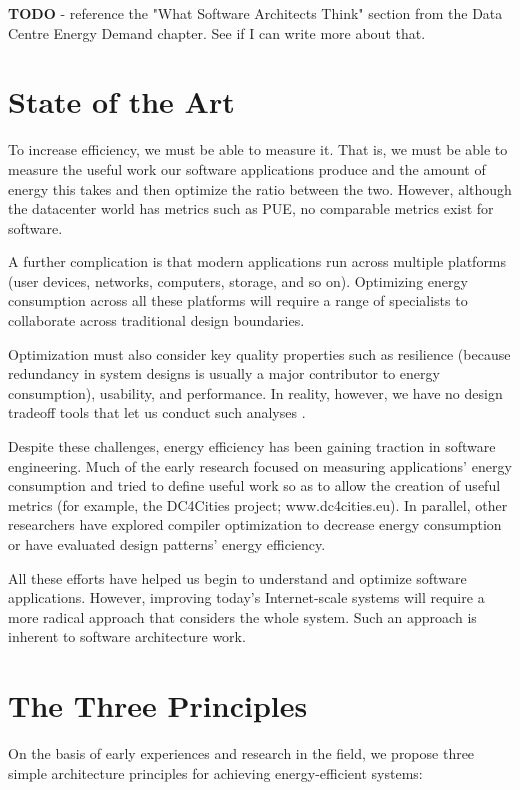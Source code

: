 \textbf{TODO} - reference the "What Software Architects Think" section from the Data Centre Energy Demand chapter.  See if I can write more about that.

\section{State of the Art}

To increase efficiency, we must be able to measure it. That is, we must be able to measure the useful work our software applications produce and the amount of energy this takes and then optimize the ratio between the two. However, although the datacenter world has metrics such as PUE, no comparable metrics exist for software.

A further complication is that modern applications run across multiple platforms (user devices, networks, computers, storage, and so on). Optimizing energy consumption across all these platforms will require a range of specialists to collaborate across traditional design boundaries.

Optimization must also consider key quality properties such as resilience (because redundancy in system designs is usually a major contributor to energy consumption), usability, and performance. In reality, however, we have no design tradeoff tools that let us conduct such analyses \cite{bashroush2016-datacentreenergy}.

Despite these challenges, energy efficiency has been gaining traction in software engineering. Much of the early research focused on measuring applications' energy consumption \cite{islam2016-energysoftwarefeatures} and tried to define useful work so as to allow the creation of useful metrics (for example, the DC4Cities project; www.dc4cities.eu). In parallel, other researchers have explored compiler optimization to decrease energy consumption or have evaluated design patterns' energy efficiency.

All these efforts have helped us begin to understand and optimize software applications. However, improving today's Internet-scale systems will require a more radical approach that considers the whole system. Such an approach is inherent to software architecture work.

\section{The Three Principles}

On the basis of early experiences and research in the field, we propose three simple architecture principles for achieving energy-efficient systems:

